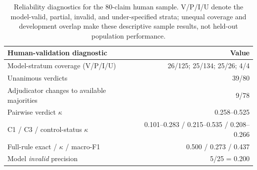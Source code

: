 \begin{table}[t]
\centering
\small
\setlength{\tabcolsep}{4pt}
\begin{tabularx}{\columnwidth}{Xr}
\toprule
\textbf{Human-validation diagnostic} & \textbf{Value} \\
\midrule
Model-stratum coverage (V/P/I/U) & 26/125; 25/134; 25/26; 4/4 \\
Unanimous verdicts & 39/80 \\
Adjudicator changes to available majorities & 9/78 \\
Pairwise verdict $\kappa$ & 0.258--0.525 \\
C1 / C3 / control-status $\kappa$ &
0.101--0.283 /
0.215--0.535 /
0.208--0.266 \\
Full-rule exact / $\kappa$ / macro-F1 &
0.500 / 0.273 /
0.437 \\
Model \emph{invalid} precision &
5/25 =
0.200 \\
\bottomrule
\end{tabularx}
\caption{Reliability diagnostics for the 80-claim human sample. V/P/I/U
denote the model-valid, partial, invalid, and under-specified strata; unequal
coverage and development overlap make these descriptive sample results, not
held-out population performance.}
\label{tab:main-human-validation}
\end{table}
